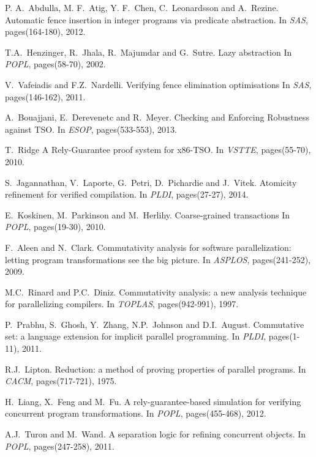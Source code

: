 \documentclass[preprint,9pt]{sigplanconf}
\begin{document}
\begin{thebibliography}{10}
P. A.~Abdulla, M. F.~Atig, Y. F.~Chen, C.~Leonardsson and A.~Rezine.
\newblock Automatic fence insertion in integer programs via predicate abstraction.
\newblock In {\em SAS}, pages(164-180), 2012.

T.A.~Henzinger, R.~Jhala, R.~Majumdar and G.~Sutre.
\newblock Lazy abstraction
\newblock In {\em POPL}, pages(58-70), 2002.

V.~Vafeiadis and F.Z.~Nardelli.
\newblock Verifying fence elimination optimisations
\newblock In {\em SAS}, pages(146-162), 2011.

A.~Bouajjani, E.~Derevenetc and R.~Meyer.
\newblock Checking and Enforcing Robustness against TSO.
\newblock In {\em ESOP}, pages(533-553), 2013.

T.~Ridge
\newblock A Rely-Guarantee proof system for x86-TSO.
\newblock In {\em VSTTE}, pages(55-70), 2010.

S.~Jagannathan, V.~Laporte, G.~Petri, D.~Pichardie and J.~Vitek.
\newblock Atomicity refinement for verified compilation.
\newblock In {\em PLDI}, pages(27-27), 2014.

E.~Koskinen, M.~Parkinson and M.~Herlihy.
\newblock Coarse-grained transactions
\newblock In {\em POPL}, pages(19-30), 2010.

F.~Aleen and N.~Clark.
\newblock Commutativity analysis for software parallelization: letting program transformations see the big picture.
\newblock In {\em ASPLOS}, pages(241-252), 2009.

M.C.~Rinard and P.C.~Diniz.
\newblock Commutativity analysis: a new analysis technique for parallelizing compilers.
\newblock In {\em TOPLAS}, pages(942-991), 1997.

P.~Prabhu, S.~Ghosh, Y.~Zhang, N.P.~Johnson and D.I.~August.
\newblock Commutative set: a language extension for implicit parallel programming.
\newblock In {\em PLDI}, pages(1-11), 2011.

R.J.~Lipton.
\newblock Reduction: a method of proving properties of parallel programs.
\newblock In {\em CACM}, pages(717-721), 1975.

H.~Liang, X.~Feng and M.~Fu.
\newblock A rely-guarantee-based simulation for verifying concurrent program transformations.
\newblock In {\em POPL}, pages(455-468), 2012.

A.J.~Turon and M.~Wand.
\newblock A separation logic for refining concurrent objects.
\newblock In {\em POPL}, pages(247-258), 2011.


\end{thebibliography}
\end{document}

